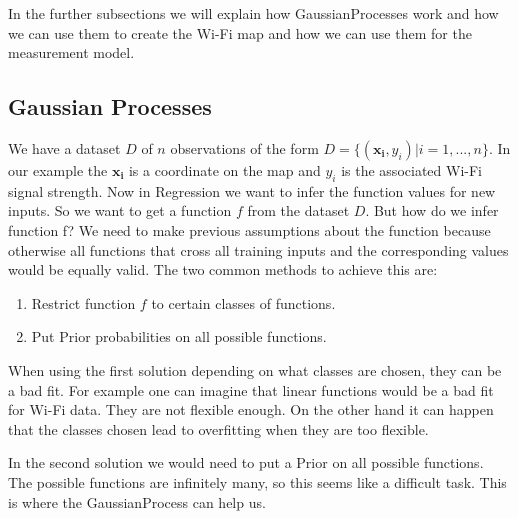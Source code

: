 In the further subsections we will explain how \Gls{GaussianProcess}es work and how we can use them to create the Wi-Fi map and how we can use them for the measurement model.

\subsection{Gaussian Processes}\label{sec:gp_basics}
We have a dataset $D$ of $n$ observations of the form $D=\{(\mathbf{x_i},y_i)|i = 1,...,n\}$. In our example the $\mathbf{x_i}$ is a coordinate on the map and $y_i$ is the associated Wi-Fi signal strength. Now in \gls{Regression} we want to infer the function values for new inputs. So we want to get a function $f$ from the dataset $D$. 
But how do we infer function f? We need to make previous assumptions about the function because otherwise all functions that cross all training inputs and the corresponding values would be equally valid. The two common methods to achieve this are: \citep[p. 2]{Rasmussen:2005:GPM:1162254}
\begin{enumerate}
	\setlength\itemsep{0 em}
	\item Restrict function $f$ to certain classes of functions.
	\item Put \gls{Prior} probabilities on all possible functions.
\end{enumerate}
When using the first solution depending on what classes are chosen, they can be a bad fit. For example one can imagine that linear functions would be a bad fit for Wi-Fi data. They are not flexible enough. On the other hand it can happen that the classes chosen lead to overfitting when they are too flexible\citep[p. 2]{Rasmussen:2005:GPM:1162254}.

In the second solution we would need to put a \gls{Prior} on all possible functions. The possible functions are infinitely many, so this seems like a difficult task. This is where the \Gls{GaussianProcess} can help us. 

